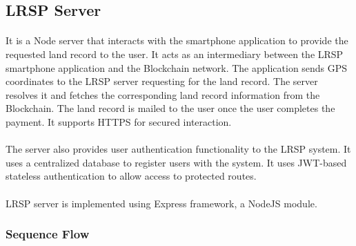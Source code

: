 \documentclass{article}
\begin{document}
    \subsection{LRSP Server}
        \paragraph{}
        It is a Node server that interacts with the smartphone application to provide the requested land record to the user. It acts as an intermediary between the LRSP smartphone application and the Blockchain network. The application sends GPS coordinates to the LRSP server requesting for the land record. The server resolves it and fetches the corresponding land record information from the Blockchain. The land record is mailed to the user once the user completes the payment. It supports HTTPS for secured interaction.
        
        \paragraph{}
        The server also provides user authentication functionality to the LRSP system. It uses a centralized database to register users with the system. It uses JWT-based stateless authentication to allow access to protected routes.

        \paragraph{}
        LRSP server is implemented using Express framework, a NodeJS module.
        
        \subsubsection{Sequence Flow}
\end{document}
